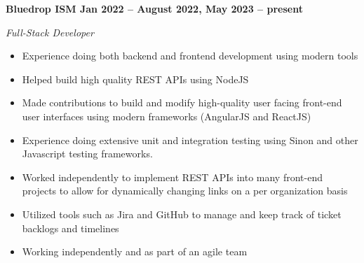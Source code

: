 \vspace{0.1cm}
\textbf{Bluedrop ISM \hfill Jan 2022 -- August 2022, May 2023 -- present} \par
\textit{Full-Stack Developer} \par
\begin{itemize}
	\item Experience doing both backend and frontend development using modern tools
    \item Helped build high quality REST APIs using NodeJS
    \item Made contributions to build and modify high-quality user facing front-end user interfaces using modern frameworks (AngularJS and ReactJS)
    \item Experience doing extensive unit and integration testing using Sinon and other Javascript testing frameworks.
    \item Worked independently to implement REST APIs into many front-end projects to allow for dynamically changing links on a per organization basis
    \item Utilized tools such as Jira and GitHub to manage and keep track of ticket backlogs and timelines
    \item Working independently and as part of an agile team
\end{itemize} \par